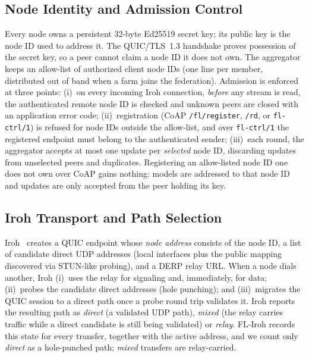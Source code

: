 \subsection{Node Identity and Admission Control}
\label{sec:admission}

Every node owns a persistent 32-byte Ed25519 secret key; its public key is the node ID used to address it. The QUIC/TLS~1.3 handshake proves possession of the secret key, so a peer cannot claim a node ID it does not own. The aggregator keeps an allow-list of authorized client node IDs (one line per member, distributed out of band when a farm joins the federation). Admission is enforced at three points: (i)~on every incoming Iroh connection, \emph{before} any stream is read, the authenticated remote node ID is checked and unknown peers are closed with an application error code; (ii)~registration (CoAP \texttt{/fl/register}, \texttt{/rd}, or \texttt{fl-ctrl/1}) is refused for node IDs outside the allow-list, and over \texttt{fl-ctrl/1} the registered endpoint must belong to the authenticated sender; (iii)~each round, the aggregator accepts at most one update per \emph{selected} node ID, discarding updates from unselected peers and duplicates. Registering an allow-listed node ID one does not own over CoAP gains nothing: models are addressed to that node ID and updates are only accepted from the peer holding its key.

\subsection{Iroh Transport and Path Selection}
\label{sec:transport}

Iroh~\cite{iroh2024} creates a QUIC endpoint whose \emph{node address} consists of the node ID, a list of candidate direct UDP addresses (local interfaces plus the public mapping discovered via STUN-like probing), and a DERP relay URL. When a node dials another, Iroh (i)~uses the relay for signaling and, immediately, for data; (ii)~probes the candidate direct addresses (hole punching); and (iii)~migrates the QUIC session to a direct path once a probe round trip validates it. Iroh reports the resulting path as \emph{direct} (a validated UDP path), \emph{mixed} (the relay carries traffic while a direct candidate is still being validated) or \emph{relay}. FL-Iroh records this state for every transfer, together with the active address, and we count only \emph{direct} as a hole-punched path; \emph{mixed} transfers are relay-carried.

